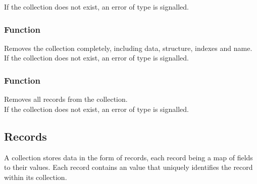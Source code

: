 \noindent If the collection does not exist, an error of type  is signalled.

\subsubsection{Function }
Removes the collection completely, including data, structure, indexes and name. \\

\noindent If the collection does not exist, an error of type  is signalled.

\subsubsection{Function }
Removes all records from the collection. \\

\noindent If the collection does not exist, an error of type  is signalled.

\subsection{Records}
A collection stores data in the form of records, each record being a map of fields to their values. Each record contains an  value that uniquely identifies the record within its collection.

